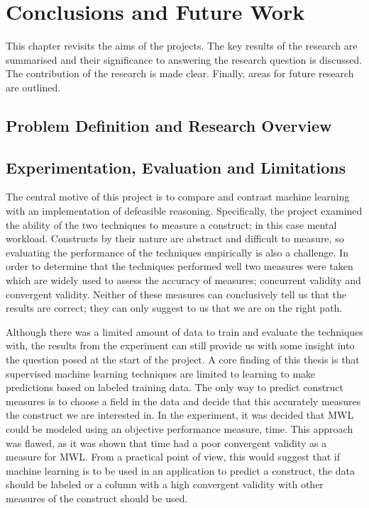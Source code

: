 
\chapter{Conclusions and Future Work} %

\label{Chapter6} 


This chapter revisits the aims of the projects. The key results of the research are summarised and their significance to answering the research question is discussed. The contribution of the research is made clear. Finally, areas for future research are outlined.

\section{Problem Definition and Research Overview}


\section{Experimentation, Evaluation and Limitations}

The central motive of this project is to compare and contrast machine learning with an implementation of defeasible reasoning. Specifically, the project examined the ability of the two techniques to measure a construct; in this case mental workload. Constructs by their nature are abstract and difficult to measure, so evaluating the performance of the techniques empirically is also a challenge. In order to determine that the techniques performed well two measures were taken which are widely used to assess the accuracy of measures; concurrent validity and convergent validity. Neither of these measures can conclusively tell us that the results are correct; they can only suggest to us that we are on the right path.

Although there was a limited amount of data to train and evaluate the techniques with, the results from the experiment can still provide us with some insight into the question posed at the start of the project. A core finding of this thesis is that supervised machine learning techniques are limited to learning to make predictions based on labeled training data. The only way to predict construct measures is to choose a field in the data and decide that this accurately measures the construct we are interested in. In the experiment, it was decided that MWL could be modeled using an objective performance measure, time. This approach was flawed, as it was shown that time had a poor convergent validity as a measure for MWL. From a practical point of view, this would suggest that if machine learning is to be used in an application to predict a construct, the data should be labeled or a column with a high convergent validity with other measures of the construct should be used. 

